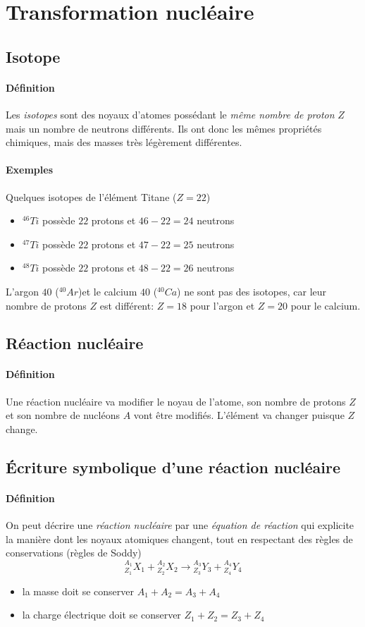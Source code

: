 \section{Transformation nucléaire}
\subsection{Isotope}
\paragraph{Définition} Les \textit{isotopes} sont des noyaux d'atomes possédant le \textit{même nombre de proton} $Z$ mais un nombre de neutrons différents.
Ils ont donc les mêmes propriétés chimiques, mais des masses très légèrement différentes.
\paragraph{Exemples} Quelques isotopes de l'élément Titane ($Z=22$)
\begin{itemize}
 \item ${}^{46}Ti $ possède $22$ protons et $46-22=24$ neutrons
 \item ${}^{47}Ti $ possède $22$ protons et $47-22=25$ neutrons
 \item ${}^{48}Ti $ possède $22$ protons et $48-22=26$ neutrons 
\end{itemize}
L'argon $40$ (${}^{40}Ar$)et le calcium $40$ (${}^{40}Ca$) ne sont pas des isotopes, car leur nombre de protons $Z$ est différent: $Z= 18$ pour
l'argon et $Z =  20$ pour le calcium.

\subsection{Réaction nucléaire}
\paragraph{Définition} Une réaction nucléaire va modifier le noyau de l'atome, son nombre de protons $Z$ et son nombre de nucléons $A$ vont être modifiés.
L'élément va changer puisque $Z$ change.

\subsection{Écriture symbolique d'une réaction nucléaire}
\paragraph{Définition} On peut décrire une \textit{réaction nucléaire} par une \textit{équation de réaction} qui explicite la manière dont les noyaux atomiques changent, tout en respectant des règles de conservations (règles de Soddy)
$$ {}^{A_1}_{Z_1}X_1 + {}^{A_2}_{Z_2}X_2 \xrightarrow{} {}^{A_3}_{Z_3}Y_3 + {}^{A_4}_{Z_4}Y_4$$
\begin{itemize}
 \item la masse doit se conserver $A_1 + A_2 = A_3 + A_4$
 \item la charge électrique doit se conserver $Z_1 + Z_2 = Z_3 + Z_4$
\end{itemize}

